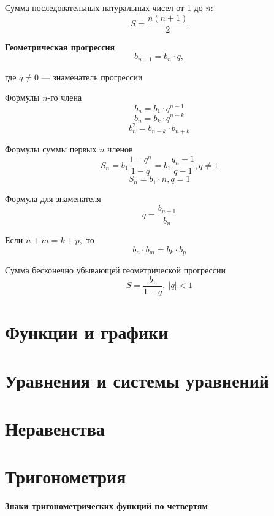 \documentclass[a4paper, 14pt]{extarticle}
\begin{document}
{Сумма последовательных натуральных чисел от  1 до $n:$
$$S=\frac{n(n+1)}{2}$$

\newpage
\textbf{Геометрическая прогрессия}
$$
b_{n+1}=b_n\cdot q,$$ 

где $q\not= 0$ --- знаменатель  прогрессии

Формулы $n$-го члена
$$b_n=b_1\cdot q^{n-1}$$
$$b_n=b_k\cdot q^{n-k}$$
$$b_n^2=b_{n-k}\cdot b_{n+k}$$

Формулы суммы первых $n$ членов
$$S_n=b_1\frac{1-q^n}{1-q}=b_1\frac{q_n-1}{q-1}, q\not=1$$
$$S_n=b_1\cdot n, q=1$$

Формула для знаменателя
$$q=\frac{b_{n+1}}{b_n}$$

Если $n+m=k+p,$ то
$$b_n\cdot b_m=b_k\cdot b_p$$

Сумма бесконечно убывающей геометрической прогрессии
$$S=\frac{b_1}{1-q},\  |q|<1$$

\newpage
\section{Функции и графики}

\section{Уравнения и системы уравнений}

\section{Неравенства}

\section{Тригонометрия}

\textbf{Знаки тригонометрических функций по четвертям}

}
\end{document}
